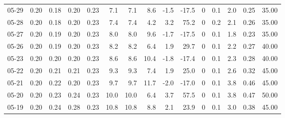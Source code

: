 \begin{threeparttable}
{\begin{tabular}{lrrrrrrrrrrrrrr}
  05-29 &          0.20 &          0.18 &          0.20 &        0.23 &                 7.1 &                7.1 &                 8.6 &       -1.5 &        -17.5 &              0 &                 0.1 &              2.0 &            0.25 &                  35.00 \\
  05-28 &          0.20 &          0.18 &          0.20 &        0.23 &                 7.4 &                7.4 &                 4.2 &        3.2 &         75.2 &              0 &                 0.2 &              2.1 &            0.26 &                  35.00 \\
  05-27 &          0.20 &          0.19 &          0.20 &        0.23 &                 8.0 &                8.0 &                 9.6 &       -1.7 &        -17.5 &              0 &                 0.1 &              1.8 &            0.23 &                  35.00 \\
  05-26 &          0.20 &          0.19 &          0.20 &        0.23 &                 8.2 &                8.2 &                 6.4 &        1.9 &         29.7 &              0 &                 0.1 &              2.2 &            0.27 &                  40.00 \\
  05-23 &          0.20 &          0.20 &          0.20 &        0.23 &                 8.6 &                8.6 &                10.4 &       -1.8 &        -17.4 &              0 &                 0.1 &              2.3 &            0.28 &                  40.00 \\
  05-22 &          0.20 &          0.21 &          0.21 &        0.23 &                 9.3 &                9.3 &                 7.4 &        1.9 &         25.0 &              0 &                 0.1 &              2.6 &            0.32 &                  45.00 \\
  05-21 &          0.20 &          0.22 &          0.20 &        0.23 &                 9.7 &                9.7 &                11.7 &       -2.0 &        -17.0 &              0 &                 0.1 &              3.8 &            0.46 &                  45.00 \\
  05-20 &          0.20 &          0.23 &          0.24 &        0.23 &                10.0 &               10.0 &                 6.4 &        3.7 &         57.5 &              0 &                 0.1 &              3.8 &            0.47 &                  50.00 \\
  05-19 &          0.20 &          0.24 &          0.28 &        0.23 &                10.8 &               10.8 &                 8.8 &        2.1 &         23.9 &              0 &                 0.1 &              3.0 &            0.38 &                  45.00 \\

\end{tabular}}
\end{threeparttable}
